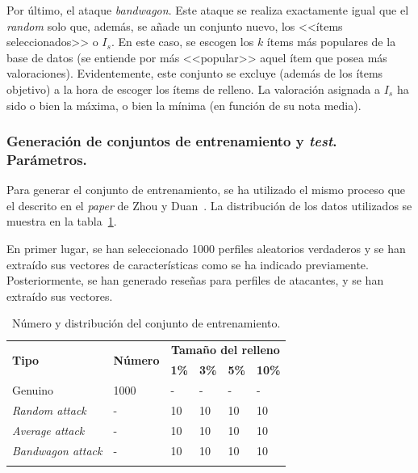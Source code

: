 Por último, el ataque \textit{bandwagon}. Este ataque se realiza exactamente igual que el \textit{random} solo que, además, se añade un conjunto nuevo, los <<ítems seleccionados>> o $I_s$. En este caso, se escogen los $k$ ítems más populares de la base de datos (se entiende por más <<popular>> aquel ítem que posea más valoraciones). Evidentemente, este conjunto se excluye (además de los ítems objetivo) a la hora de escoger los ítems de relleno. La valoración asignada a $I_s$ ha sido o bien la máxima, o bien la mínima (en función de su nota media).

\subsubsection{Generación de conjuntos de entrenamiento y \textit{test}. Parámetros.}

Para generar el conjunto de entrenamiento, se ha utilizado el mismo proceso que el descrito en el \textit{paper} de Zhou y Duan~\cite{zhou2021SemisupervisedRecommendationAttack}. La distribución de los datos utilizados se muestra en la tabla~\ref{tbl:entrenamiento_ML10M}.

En primer lugar, se han seleccionado 1000 perfiles aleatorios verdaderos y se han extraído sus vectores de características como se ha indicado previamente. Posteriormente, se han generado reseñas para perfiles de atacantes, y se han extraído sus vectores.

\begin{table}
	\begin{centering}
		\begin{tabular}{@{} p{9em} p{7em} p{3em} p{3em} p{3em} p{3em} @{}}
			\toprule
			\multirow{2}{*}{\hfil \textbf{Tipo}} & \multirow{2}{*}{\hfil \textbf{Número}} & \multicolumn{4}{c}{\hfil \textbf{Tamaño del relleno}} \\ \cmidrule{3-6}
			&\hfil   &\hfil \textbf{1\%} &\hfil \textbf{3\%} & \hfil \textbf{5\%} & \hfil \textbf{10\%}\\ 
			\toprule
			Genuino &1000&\hfil -	& \hfil -  & \hfil - & \hfil -\\
			\textit{Random attack} &-	&\hfil 10 & \hfil 10	&  \hfil 10 & \hfil 10\\
			\textit{Average attack} &-	& \hfil 10 & \hfil 10 & \hfil 10 & \hfil 10 \\
			\textit{Bandwagon attack} &- & \hfil 10 & \hfil 10 & \hfil 10 & \hfil10 \\
			\\ \bottomrule
		\end{tabular}
	\end{centering}
	\caption[Sistemas de recomendación: descripción de los conjuntos]{Número y distribución del conjunto de entrenamiento.}
	\label{tbl:entrenamiento_ML10M}	
\end{table}

